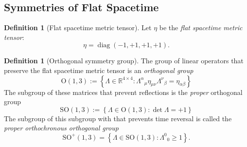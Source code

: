 \documentclass{amsart}
\theoremstyle{definition}
\newtheorem{definition}[theorem]{Definition}
\theoremstyle{remark}
\DeclareMathOperator{\diag}{diag}
\begin{document}
\subsection{Symmetries of Flat Spacetime}
\label{subsec:so13_group}
\begin{definition}[Flat spacetime metric tensor]
  Let $\eta$ be the \emph{flat spacetime metric tensor}:
  \begin{equation*}
    \eta = \diag(-1, +1, +1, +1).
  \end{equation*}
\end{definition}

\begin{definition}[Orthogonal symmetry group]\label{def:orthogonal_symmetry_group}
  The group of linear operators that preserve the flat spacetime metric tensor is an \emph{orthogonal group}
  \begin{equation*}
    \mathrm{O}(1,3) := \left\{\Lambda\in\mathbb{R}^{4\times4}: \Lambda^\alpha{}_\mu\eta_{\mu\nu}\Lambda^\nu{}_\beta=\eta_{\alpha\beta}\right\}
  \end{equation*}
  The subgroup of these matrices that prevent reflections is the \emph{proper} orthogonal group
  \begin{equation*}
    \mathrm{SO}(1,3) := \left\{\Lambda\in\mathrm{O}(1,3): \det\Lambda = +1\right\}
  \end{equation*}
  The subgroup of this subgroup with that prevents time reversal is called the \emph{proper orthochronous orthogonal group}
  \begin{equation*}
    \mathrm{SO}^+(1,3) = \left\{ \Lambda \in \mathrm{SO}(1,3) : \Lambda^0{}_0 \geq 1 \right\}.
  \end{equation*}
\end{definition}
\end{document}

